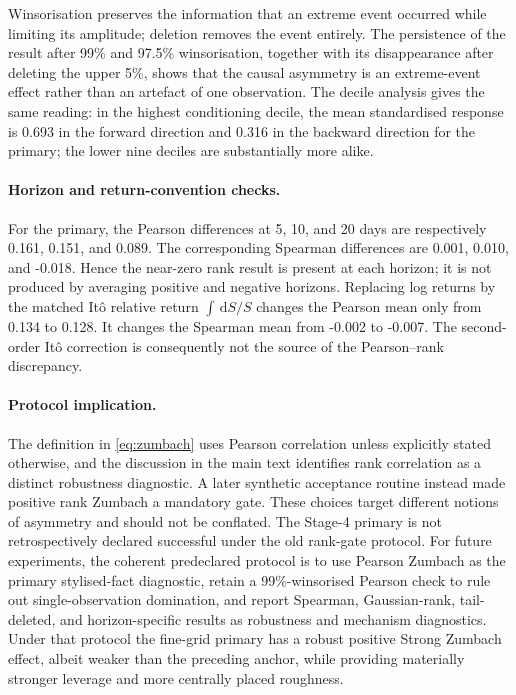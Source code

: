 \documentclass[11pt,a4paper]{article}
\newcommand{\dd}{\,\mathrm{d}}
\begin{document}
Winsorisation preserves the information that an extreme event occurred while limiting its
amplitude; deletion removes the event entirely. The persistence of the result after 99\% and
97.5\% winsorisation, together with its disappearance after deleting the upper 5\%, shows
that the causal asymmetry is an extreme-event effect rather than an artefact of one observation.
The decile analysis gives the same reading: in the highest conditioning decile, the mean
standardised response is 0.693 in the forward direction and 0.316 in the backward direction for
the primary; the lower nine deciles are substantially more alike.

\paragraph{Horizon and return-convention checks.}
For the primary, the Pearson differences at 5, 10, and 20 days are respectively 0.161, 0.151,
and 0.089. The corresponding Spearman differences are 0.001, 0.010, and -0.018. Hence the
near-zero rank result is present at each horizon; it is not produced by averaging positive and
negative horizons. Replacing log returns by the matched It\^o relative return
\(\int \dd S/S\) changes the Pearson mean only from 0.134 to 0.128. It changes the Spearman
mean from -0.002 to -0.007. The second-order It\^o correction is consequently not the source
of the Pearson--rank discrepancy.

\pagebreak
\paragraph{Protocol implication.}
The definition in \cref{eq:zumbach} uses Pearson correlation unless explicitly stated
otherwise, and the discussion in the main text identifies rank correlation as a distinct
robustness diagnostic. A later synthetic acceptance routine instead made positive rank
Zumbach a mandatory gate. These choices target different notions of asymmetry and should not
be conflated. The Stage-4 primary is not retrospectively declared successful under the old
rank-gate protocol. For future experiments, the coherent predeclared protocol is to use
Pearson Zumbach as the primary stylised-fact diagnostic, retain a 99\%-winsorised Pearson check
to rule out single-observation domination, and report Spearman, Gaussian-rank, tail-deleted,
and horizon-specific results as robustness and mechanism diagnostics. Under that protocol the
fine-grid primary has a robust positive Strong Zumbach effect, albeit weaker than the preceding
anchor, while providing materially stronger leverage and more centrally placed roughness.
\end{document}

